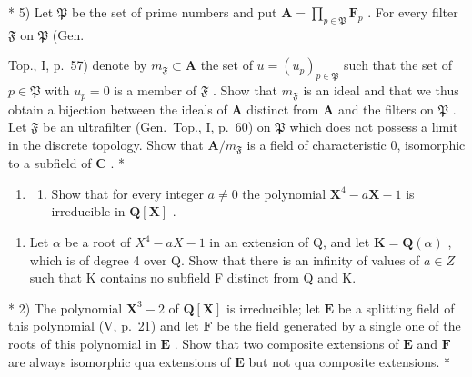 * 5) Let \(\mathfrak{P}\) be the set of prime numbers and put \(\mathbf{A} = \prod_{p\in \mathfrak{P}}\mathbf{F}_p\) . For every filter \(\mathfrak{F}\) on \(\mathfrak{P}\) (Gen.

Top., I, p.~57) denote by \(m_{\mathfrak{F}} \subset \mathbf{A}\) the set of \(u = (u_p)_{p \in \mathfrak{P}}\) such that the set of \(p \in \mathfrak{P}\) with \(u_p = 0\) is a member of \(\mathfrak{F}\) . Show that \(m_{\mathfrak{F}}\) is an ideal and that we thus obtain a bijection between the ideals of \(\mathbf{A}\) distinct from \(\mathbf{A}\) and the filters on \(\mathfrak{P}\) . Let \(\mathfrak{F}\) be an ultrafilter (Gen.~Top., I, p.~60) on \(\mathfrak{P}\) which does not possess a limit in the discrete topology. Show that \(\mathbf{A}/m_{\mathfrak{F}}\) is a field of characteristic 0, isomorphic to a subfield of \(\mathbf{C}\) . *

\BourbakiExerciseGroup

\begin{enumerate}
\def\labelenumi{\arabic{enumi})}
\tightlist
\item
  \begin{enumerate}
  \def\labelenumii{\alph{enumii})}
  \tightlist
  \item
    Show that for every integer \(a \neq 0\) the polynomial \(\mathbf{X}^4 - a\mathbf{X} - 1\) is irreducible in \(\mathbf{Q}[\mathbf{X}]\) .
  \end{enumerate}
\end{enumerate}

\begin{enumerate}
\def\labelenumi{\alph{enumi})}
\setcounter{enumi}{1}
\tightlist
\item
  Let \(\alpha\) be a root of \(X^{4}-aX-1\) in an extension of Q, and let \(\mathbf{K}=\mathbf{Q}(\alpha)\) , which is of degree 4 over Q. Show that there is an infinity of values of \(a\in Z\) such that K contains no subfield F distinct from Q and K.
\end{enumerate}

* 2) The polynomial \(\mathbf{X}^3 - 2\) of \(\mathbf{Q}[\mathbf{X}]\) is irreducible; let \(\mathbf{E}\) be a splitting field of this polynomial (V, p.~21) and let \(\mathbf{F}\) be the field generated by a single one of the roots of this polynomial in \(\mathbf{E}\) . Show that two composite extensions of \(\mathbf{E}\) and \(\mathbf{F}\) are always isomorphic qua extensions of \(\mathbf{E}\) but not qua composite extensions. *

